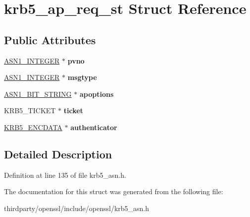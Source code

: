 \hypertarget{structkrb5__ap__req__st}{}\section{krb5\+\_\+ap\+\_\+req\+\_\+st Struct Reference}
\label{structkrb5__ap__req__st}
\subsection*{Public Attributes}
\begin{DoxyCompactItemize}
\item 
\mbox{\label{structkrb5__ap__req__st_ad7f61cf7b1d536b06dde3c71776c118f}} 
\hyperlink{structasn1__string__st}{A\+S\+N1\+\_\+\+I\+N\+T\+E\+G\+ER} $\ast$ {\bfseries pvno}
\item 
\mbox{\label{structkrb5__ap__req__st_a95993daaa70c2d6dc49746ea6867f790}} 
\hyperlink{structasn1__string__st}{A\+S\+N1\+\_\+\+I\+N\+T\+E\+G\+ER} $\ast$ {\bfseries msgtype}
\item 
\mbox{\label{structkrb5__ap__req__st_ae43d1ed55bdd32998d4fab8918f62d6b}} 
\hyperlink{structasn1__string__st}{A\+S\+N1\+\_\+\+B\+I\+T\+\_\+\+S\+T\+R\+I\+NG} $\ast$ {\bfseries apoptions}
\item 
\mbox{\label{structkrb5__ap__req__st_a9f842653f3c353af99fdd723151d26a4}} 
K\+R\+B5\+\_\+\+T\+I\+C\+K\+ET $\ast$ {\bfseries ticket}
\item 
\mbox{\label{structkrb5__ap__req__st_aa3f69c831c3e59add2c118ce00b974e9}} 
\hyperlink{structkrb5__encdata__st}{K\+R\+B5\+\_\+\+E\+N\+C\+D\+A\+TA} $\ast$ {\bfseries authenticator}
\end{DoxyCompactItemize}


\subsection{Detailed Description}


Definition at line 135 of file krb5\+\_\+asn.\+h.



The documentation for this struct was generated from the following file\+:\begin{DoxyCompactItemize}
\item 
thirdparty/openssl/include/openssl/krb5\+\_\+asn.\+h\end{DoxyCompactItemize}
